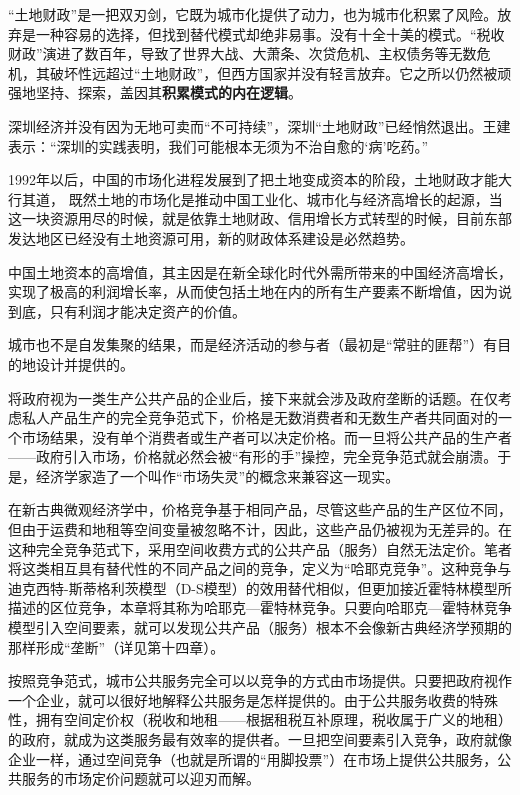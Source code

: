“土地财政”是一把双刃剑，它既为城市化提供了动力，也为城市化积累了风险。放弃是一种容易的选择，但找到替代模式却绝非易事。没有十全十美的模式。“税收财政”演进了数百年，导致了世界大战、大萧条、次贷危机、主权债务等无数危机，其破坏性远超过“土地财政”，但西方国家并没有轻言放弃。它之所以仍然被顽强地坚持、探索，盖因其\textbf{积累模式的内在逻辑}。

深圳经济并没有因为无地可卖而“不可持续”，深圳“土地财政”已经悄然退出。王建表示：“深圳的实践表明，我们可能根本无须为不治自愈的‘病’吃药。”

1992年以后，中国的市场化进程发展到了把土地变成资本的阶段，土地财政才能大行其道，
既然土地的市场化是推动中国工业化、城市化与经济高增长的起源，当这一块资源用尽的时候，就是依靠土地财政、信用增长方式转型的时候，目前东部发达地区已经没有土地资源可用，新的财政体系建设是必然趋势。

中国土地资本的高增值，其主因是在新全球化时代外需所带来的中国经济高增长，实现了极高的利润增长率，从而使包括土地在内的所有生产要素不断增值，因为说到底，只有利润才能决定资产的价值。

城市也不是自发集聚的结果，而是经济活动的参与者（最初是“常驻的匪帮”）有目的地设计并提供的。

将政府视为一类生产公共产品的企业后，接下来就会涉及政府垄断的话题。在仅考虑私人产品生产的完全竞争范式下，价格是无数消费者和无数生产者共同面对的一个市场结果，没有单个消费者或生产者可以决定价格。而一旦将公共产品的生产者——政府引入市场，价格就必然会被“有形的手”操控，完全竞争范式就会崩溃。于是，经济学家造了一个叫作“市场失灵”的概念来兼容这一现实。

在新古典微观经济学中，价格竞争基于相同产品，尽管这些产品的生产区位不同，但由于运费和地租等空间变量被忽略不计，因此，这些产品仍被视为无差异的。在这种完全竞争范式下，采用空间收费方式的公共产品（服务）自然无法定价。笔者将这类相互具有替代性的不同产品之间的竞争，定义为“哈耶克竞争”。这种竞争与迪克西特-斯蒂格利茨模型（D-S模型）的效用替代相似，但更加接近霍特林模型所描述的区位竞争，本章将其称为哈耶克—霍特林竞争。只要向哈耶克—霍特林竞争模型引入空间要素，就可以发现公共产品（服务）根本不会像新古典经济学预期的那样形成“垄断”（详见第十四章）。

按照竞争范式，城市公共服务完全可以以竞争的方式由市场提供。只要把政府视作一个企业，就可以很好地解释公共服务是怎样提供的。由于公共服务收费的特殊性，拥有空间定价权（税收和地租——根据租税互补原理，税收属于广义的地租）的政府，就成为这类服务最有效率的提供者。一旦把空间要素引入竞争，政府就像企业一样，通过空间竞争（也就是所谓的“用脚投票”）在市场上提供公共服务，公共服务的市场定价问题就可以迎刃而解。

